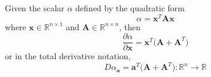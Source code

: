   \begin{theorem}
    Given the scalar $\alpha$ defined by the quadratic form 
    \begin{equation}
      \alpha = \mathbf{x}^T \mathbf{A} \mathbf{x}
    \end{equation}
    where $\mathbf{x} \in \mathbb{R}^{n \times 1}$ and $\mathbf{A} \in \mathbb{R}^{n \times n}$, then 
    \begin{equation}
      \frac{\partial \alpha}{\partial \mathbf{x}} = \mathbf{x}^T \big( \mathbf{A} + \mathbf{A}^T \big)
    \end{equation}
    or in the total derivative notation, 
    \begin{equation}
      D \alpha_\mathbf{a} = \mathbf{a}^T \big( \mathbf{A} + \mathbf{A}^T \big) : \mathbb{R}^n \longrightarrow \mathbb{R}
    \end{equation}
  \end{theorem}

